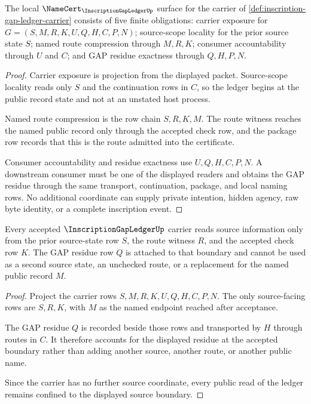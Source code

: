 \begin{theorem}
\label{thm:inscription-gap-ledger-namecert-obligations}
The local $\NameCert_{\InscriptionGapLedgerUp}$ surface for the carrier of \autoref{def:inscription-gap-ledger-carrier} consists of five finite obligations: carrier exposure for $G=(S,M,R,K,U,Q,H,C,P,N)$; source-scope locality for the prior source state $S$; named route compression through $M,R,K$; consumer accountability through $U$ and $C$; and GAP residue exactness through $Q,H,P,N$.
\end{theorem}
\begin{proof}
Carrier exposure is projection from the displayed packet. Source-scope locality reads only $S$ and the continuation rows in $C$, so the ledger begins at the public record state and not at an unstated host process.

Named route compression is the row chain $S,R,K,M$. The route witness reaches the named public record only through the accepted check row, and the package row records that this is the route admitted into the certificate.

Consumer accountability and residue exactness use $U,Q,H,C,P,N$. A downstream consumer must be one of the displayed readers and obtains the GAP residue through the same transport, continuation, package, and local naming rows. No additional coordinate can supply private intention, hidden agency, raw byte identity, or a complete inscription event.
\end{proof}

\begin{theorem}
\label{thm:inscription-gap-ledger-source-boundary}
Every accepted $\InscriptionGapLedgerUp$ carrier reads source information only from the prior source-state row $S$, the route witness $R$, and the accepted check row $K$. The GAP residue row $Q$ is attached to that boundary and cannot be used as a second source state, an unchecked route, or a replacement for the named public record $M$.
\end{theorem}
\begin{proof}
Project the carrier rows $S,M,R,K,U,Q,H,C,P,N$. The only source-facing rows are $S,R,K$, with $M$ as the named endpoint reached after acceptance.

The GAP residue $Q$ is recorded beside those rows and transported by $H$ through routes in $C$. It therefore accounts for the displayed residue at the accepted boundary rather than adding another source, another route, or another public name.

Since the carrier has no further source coordinate, every public read of the ledger remains confined to the displayed source boundary.
\end{proof}

